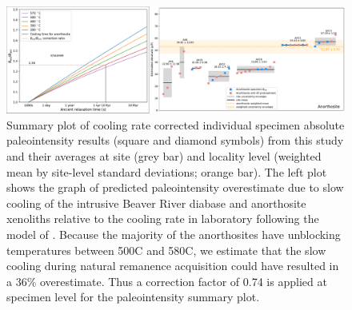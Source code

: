 \documentclass[draft]{agujournal2019}
\begin{document}
\begin{figure}[h!]
\noindent\includegraphics[width=\textwidth]{Paleointensity_plot_cooling_corrected.pdf}
\centering
\caption{\small{Summary plot of cooling rate corrected individual specimen absolute paleointensity results (square and diamond symbols) from this study and their averages at site (grey bar) and locality level (weighted mean by site-level standard deviations; orange bar). The left plot shows the graph of predicted paleointensity overestimate due to slow cooling of the intrusive Beaver River diabase and anorthosite xenoliths relative to the cooling rate in laboratory following the model of . Because the majority of the anorthosites have unblocking temperatures between 500\textdegree C and 580\textdegree C, we estimate that the slow cooling during natural remanence acquisition could have resulted in a 36\% overestimate. Thus a correction factor of 0.74 is applied at specimen level for the paleointensity summary plot.  }}
\label{fig:PINT_cooling_corrected}
\end{figure}
\end{document}
